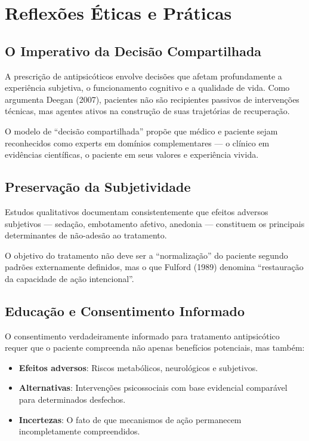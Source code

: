 \section{Reflexões Éticas e Práticas}
\label{sec:reflexoes-eticas}

\subsection{O Imperativo da Decisão Compartilhada}

A prescrição de antipsicóticos envolve decisões que afetam profundamente a experiência subjetiva, o funcionamento cognitivo e a qualidade de vida. Como argumenta Deegan (2007), pacientes não são recipientes passivos de intervenções técnicas, mas agentes ativos na construção de suas trajetórias de recuperação.

O modelo de \enquote{decisão compartilhada} propõe que médico e paciente sejam reconhecidos como experts em domínios complementares --- o clínico em evidências científicas, o paciente em seus valores e experiência vivida.

\subsection{Preservação da Subjetividade}

Estudos qualitativos documentam consistentemente que efeitos adversos subjetivos --- sedação, embotamento afetivo, anedonia --- constituem os principais determinantes de não-adesão ao tratamento.

O objetivo do tratamento não deve ser a \enquote{normalização} do paciente segundo padrões externamente definidos, mas o que Fulford (1989) denomina \enquote{restauração da capacidade de ação intencional}.

\subsection{Educação e Consentimento Informado}

O consentimento verdadeiramente informado para tratamento antipsicótico requer que o paciente compreenda não apenas benefícios potenciais, mas também:

\begin{itemize}
\item \textbf{Efeitos adversos}: Riscos metabólicos, neurológicos e subjetivos.
\item \textbf{Alternativas}: Intervenções psicossociais com base evidencial comparável para determinados desfechos.
\item \textbf{Incertezas}: O fato de que mecanismos de ação permanecem incompletamente compreendidos.
\end{itemize}

